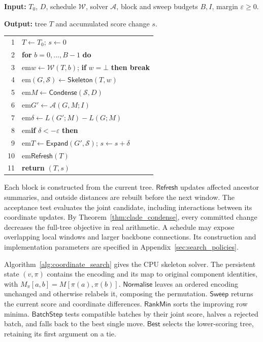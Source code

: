 \documentclass[11pt,a4paper]{article}
\makeatletter
\newcommand{\algindent}[1]{\hangindent=#1em\hangafter=1\hspace*{#1em}}
\newcommand{\proc}[1]{\mathsf{#1}}
\DeclareRobustCommand{\_}{\ifmmode\nfss@text{\textunderscore}\else\textunderscore\allowbreak\fi}
\theoremstyle{definition}
\makeatother
\begin{document}
\begin{algorithm}[!htbp]
\caption{Full-tree and minibatch BME search}
\label{alg:block_search}
\small
\textbf{Input:} $T_0$, $D$, schedule $\mathcal W$, solver $\mathcal A$, block and sweep budgets $B,I$, margin $\varepsilon\geq0$.\par
\textbf{Output:} tree $T$ and accumulated score change $s$.\par\smallskip
\begin{tabular}{@{}r@{\quad}>{\raggedright\arraybackslash}p{.93\linewidth}@{}}
1 & $T\gets T_0$; $s\gets0$\\
2 & \textbf{for} $b=0,\ldots,B-1$ \textbf{do}\\
3 & \algindent{1}$w\gets\mathcal W(T,b)$; \textbf{if} $w=\bot$ \textbf{then break}\\
4 & \algindent{1}$(G,\mathcal S)\gets\proc{Skeleton}(T,w)$\\
5 & \algindent{1}$M\gets\proc{Condense}(\mathcal S,D)$\\
6 & \algindent{1}$G'\gets\mathcal A(G,M;I)$\\
7 & \algindent{1}$\delta\gets L(G';M)-L(G;M)$\\
8 & \algindent{1}\textbf{if} $\delta<-\varepsilon$ \textbf{then}\\
9 & \algindent{2}$T\gets\proc{Expand}(G',\mathcal S)$; $s\gets s+\delta$\\
10 & \algindent{2}$\proc{Refresh}(T)$\\
11 & \textbf{return} $(T,s)$\\
\end{tabular}
\end{algorithm}

Each block is constructed from the current tree.
$\proc{Refresh}$ updates affected ancestor summaries, and outside distances are rebuilt before the next window.
The acceptance test evaluates the joint candidate, including interactions between its coordinate updates.
By Theorem~\ref{thm:clade_condense}, every committed change decreases the full-tree objective in real arithmetic.
A schedule may expose overlapping local windows and larger backbone connections. Its construction and implementation parameters are specified in Appendix~\ref{sec:search_policies}.

Algorithm~\ref{alg:coordinate_search} gives the CPU skeleton solver.
The persistent state $(v,\pi)$ contains the encoding and its map to original component identities, with $M_\pi[a,b]=M[\pi(a),\pi(b)]$.
$\proc{Normalise}$ leaves an ordered encoding unchanged and otherwise relabels it, composing the permutation.
$\proc{Sweep}$ returns the current score and coordinate differences. $\proc{RankMin}$ sorts the improving row minima.
$\proc{BatchStep}$ tests compatible batches by their joint score, halves a rejected batch, and falls back to the best single move.
$\proc{Best}$ selects the lower-scoring tree, retaining its first argument on a tie.
\end{document}
